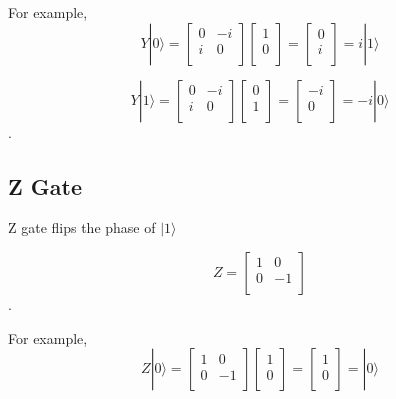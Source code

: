 For example,
\begin{equation}
Y|0\rangle = \begin{bmatrix}
0 & -i \\
i & 0 \\
\end{bmatrix} 
\left[
\begin{array}{c}
1 \\
0 \\
\end{array}
\right]
= \left[
\begin{array}{c}
0 \\
i \\
\end{array}
\right]
= i|1\rangle
\end{equation}

\begin{equation}
Y|1\rangle = \begin{bmatrix}
0 & -i \\
i & 0 \\
\end{bmatrix} 
\left[
\begin{array}{c}
0 \\
1  \\
\end{array}
\right]
= \left[
\begin{array}{c}
-i \\
0 \\
\end{array}
\right]
= -i|0\rangle
\end{equation}.

\subsection{Z Gate}
Z gate flips the phase of $ |1\rangle$

\begin{equation}
 Z = \begin{bmatrix}
1 & 0 \\
0 & -1 \\
\end{bmatrix}
\end{equation}.

For example,
\begin{equation}
 Z|0\rangle = \begin{bmatrix}
1 & 0 \\
0 & -1 \\
\end{bmatrix} 
\left[
\begin{array}{c}
1 \\
0 \\
\end{array}
\right]
= \left[
\begin{array}{c}
1 \\
0 \\
\end{array}
\right]
= |0\rangle
\end{equation}

